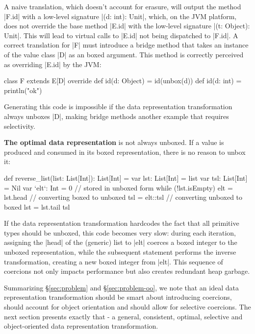 A naive translation, which doesn't account for erasure, will output the method |F.id| with a low-level signature |(d: int): Unit|, which, on the JVM platform, does not override the base method |E.id| with the low-level signature |(t: Object): Unit|. This will lead to virtual calls to |E.id| not being dispatched to |F.id|. A correct translation for |F| must introduce a bridge method that takes an instance of the value class |D| as an boxed argument. This method is correctly perceived as overriding |E.id| by the JVM:

\begin{lstlisting-nobreak}
 class F extends E[D] {
   override def id(d: Object) = id(unbox(d))
   def id(d: int) = println("ok")
 }
\end{lstlisting-nobreak}

Generating this code is impossible if the data representation transformation always unboxes |D|, making bridge methods another example that requires selectivity.

\textbf{The optimal data representation} is not always unboxed. If a value is produced and consumed in its boxed representation, there is no reason to unbox it:

\begin{lstlisting-nobreak}
 def reverse_list(list: List[Int]): List[Int] = {
   var lst: List[Int] = list
   var tsl: List[Int] = Nil
   var `elt`: Int = 0 // stored in unboxed form
   while (!lst.isEmpty) {
     elt = lst.head // converting boxed to unboxed
     tsl = elt::tsl // converting unboxed to boxed
     lst = lst.tail
   }
   tsl
 }
\end{lstlisting-nobreak}

If the data representation transformation hardcodes the fact that all primitive types should be unboxed, this code becomes very slow: during each iteration, assigning the |head| of the (generic) list to |elt| coerces a boxed integer to the unboxed representation, while the subsequent statement performs the inverse transformation, creating a new boxed integer from |elt|. This sequence of coercions not only impacts performance but also creates redundant heap garbage.

Summarizing \S\ref{sec:problem} and \S\ref{sec:problem-oo}, we note that an ideal data representation transformation should be smart about introducing coercions, should account for object orientation and should allow for selective coercions. The next section presents exactly that - a general, consistent, optimal, selective and object-oriented data representation transformation.

